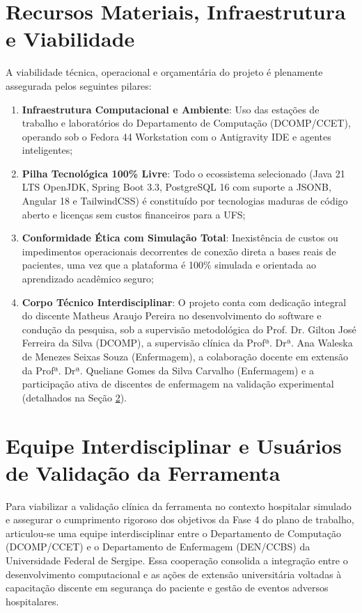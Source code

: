 \section{Recursos Materiais, Infraestrutura e Viabilidade}
\label{sec:recursos-viabilidade}

A viabilidade técnica, operacional e orçamentária do projeto é plenamente assegurada pelos seguintes pilares:
\begin{enumerate}
    \item \textbf{Infraestrutura Computacional e Ambiente}: Uso das estações de trabalho e laboratórios do Departamento de Computação (DCOMP/CCET), operando sob o Fedora 44 Workstation com o Antigravity IDE e agentes inteligentes;
    \item \textbf{Pilha Tecnológica 100\% Livre}: Todo o ecossistema selecionado (Java 21 LTS OpenJDK, Spring Boot 3.3, PostgreSQL 16 com suporte a JSONB, Angular 18 e TailwindCSS) é constituído por tecnologias maduras de código aberto e licenças sem custos financeiros para a UFS;
    \item \textbf{Conformidade Ética com Simulação Total}: Inexistência de custos ou impedimentos operacionais decorrentes de conexão direta a bases reais de pacientes, uma vez que a plataforma é 100\% simulada e orientada ao aprendizado acadêmico seguro;
    \item \textbf{Corpo Técnico Interdisciplinar}: O projeto conta com dedicação integral do discente Matheus Araujo Pereira no desenvolvimento do software e condução da pesquisa, sob a supervisão metodológica do Prof. Dr. Gilton José Ferreira da Silva (DCOMP), a supervisão clínica da Profª. Drª. Ana Waleska de Menezes Seixas Souza (Enfermagem), a colaboração docente em extensão da Profª. Drª. Queliane Gomes da Silva Carvalho (Enfermagem) e a participação ativa de discentes de enfermagem na validação experimental (detalhados na Seção \ref{sec:equipe-validacao}).
\end{enumerate}

\section{Equipe Interdisciplinar e Usuários de Validação da Ferramenta}
\label{sec:equipe-validacao}

Para viabilizar a validação clínica da ferramenta no contexto hospitalar simulado e assegurar o cumprimento rigoroso dos objetivos da Fase 4 do plano de trabalho, articulou-se uma equipe interdisciplinar entre o Departamento de Computação (DCOMP/CCET) e o Departamento de Enfermagem (DEN/CCBS) da Universidade Federal de Sergipe. Essa cooperação consolida a integração entre o desenvolvimento computacional e as ações de extensão universitária voltadas à capacitação discente em segurança do paciente e gestão de eventos adversos hospitalares.

